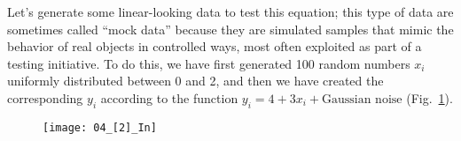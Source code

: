 
Let's generate some linear-looking data to test this equation; this type of data are sometimes called ``mock data'' because they are simulated samples that mimic the behavior of real objects in controlled ways, most often exploited as part of a testing initiative. To do this, we have first generated 100 random numbers $x_i$ uniformly distributed between 0 and 2, and then we have created the corresponding $y_i$ according to the function $y_i=4+3x_i+\text{Gaussian noise}$ (Fig.~\ref{04_[2]_In}).
\begin{figure}[h!t]
\centering
\texttt{[image: 04\_[2]\_In]}
\caption{}\label{04_[2]_In}
\end{figure}

